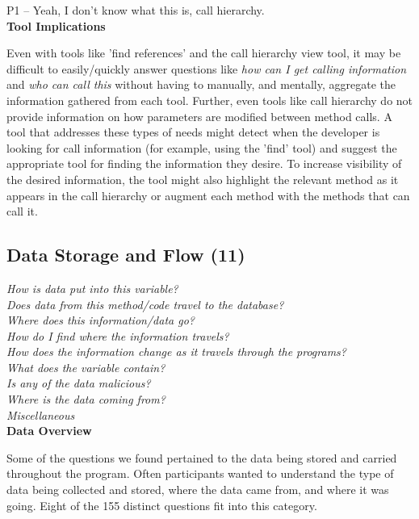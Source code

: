 \documentclass[conference]{IEEEtran}
\begin{document}
P1 -- Yeah, I don't know what this is, call hierarchy.
\\

\noindent\textbf{Tool Implications}

Even with tools like 'find references' and the call hierarchy view tool, it may be difficult to easily/quickly answer questions like \emph{how can I get calling information} and \emph{who can call this} without having to manually, and mentally, aggregate the information gathered from each tool. 
Further, even tools like call hierarchy do not provide information on how parameters are modified between method calls. 
A tool that addresses these types of needs might detect when the developer is looking for call information (for example, using the 'find' tool) and suggest the appropriate tool for finding the information they desire. 
To increase visibility of the desired information, the tool might also highlight the relevant method as it appears in the call hierarchy or augment each method with the methods that can call it.



\noindent\subsection{\textbf{Data Storage and Flow (11)}}\label{dsf}

\noindent\emph{How is data put into this variable?} \\
\emph{Does data from this method/code travel to the database?} \\
\emph{Where does this information/data go?} \\
\emph{How do I find where the information travels?} \\
\emph{How does the information change as it travels through the programs?} \\
\emph{What does the variable contain?} \\
\emph{Is any of the data malicious?} \\
\emph{Where is the data coming from?} \\
\emph{Miscellaneous} \\

\noindent\textbf{Data Overview}

Some of the questions we found pertained to the data being stored and carried throughout the program. 
Often participants wanted to understand  the type of data being collected and stored, where the data came from, and where it was going. 
Eight of the 155 distinct questions fit into this category.
\\
\end{document}
